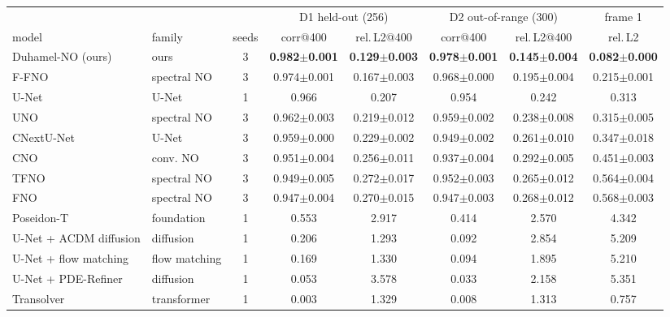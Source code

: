 \begin{tabular}{llcccccc}
\toprule
 & & & \multicolumn{2}{c}{D1 held-out (256)} & \multicolumn{2}{c}{D2 out-of-range (300)} & frame 1 \\
\cmidrule(lr){4-5}\cmidrule(lr){6-7}\cmidrule(lr){8-8}
model & family & seeds & corr@400 & rel.\,L2@400 & corr@400 & rel.\,L2@400 & rel.\,L2 \\
\midrule
Duhamel-NO (ours) & ours & 3 & \textbf{0.982{\scriptsize$\pm$0.001}} & \textbf{0.129{\scriptsize$\pm$0.003}} & \textbf{0.978{\scriptsize$\pm$0.001}} & \textbf{0.145{\scriptsize$\pm$0.004}} & \textbf{0.082{\scriptsize$\pm$0.000}} \\
\midrule
F-FNO & spectral NO & 3 & 0.974{\scriptsize$\pm$0.001} & 0.167{\scriptsize$\pm$0.003} & 0.968{\scriptsize$\pm$0.000} & 0.195{\scriptsize$\pm$0.004} & 0.215{\scriptsize$\pm$0.001} \\
U-Net & U-Net & 1 & 0.966 & 0.207 & 0.954 & 0.242 & 0.313 \\
UNO & spectral NO & 3 & 0.962{\scriptsize$\pm$0.003} & 0.219{\scriptsize$\pm$0.012} & 0.959{\scriptsize$\pm$0.002} & 0.238{\scriptsize$\pm$0.008} & 0.315{\scriptsize$\pm$0.005} \\
CNextU-Net & U-Net & 3 & 0.959{\scriptsize$\pm$0.000} & 0.229{\scriptsize$\pm$0.002} & 0.949{\scriptsize$\pm$0.002} & 0.261{\scriptsize$\pm$0.010} & 0.347{\scriptsize$\pm$0.018} \\
CNO & conv. NO & 3 & 0.951{\scriptsize$\pm$0.004} & 0.256{\scriptsize$\pm$0.011} & 0.937{\scriptsize$\pm$0.004} & 0.292{\scriptsize$\pm$0.005} & 0.451{\scriptsize$\pm$0.003} \\
TFNO & spectral NO & 3 & 0.949{\scriptsize$\pm$0.005} & 0.272{\scriptsize$\pm$0.017} & 0.952{\scriptsize$\pm$0.003} & 0.265{\scriptsize$\pm$0.012} & 0.564{\scriptsize$\pm$0.004} \\
FNO & spectral NO & 3 & 0.947{\scriptsize$\pm$0.004} & 0.270{\scriptsize$\pm$0.015} & 0.947{\scriptsize$\pm$0.003} & 0.268{\scriptsize$\pm$0.012} & 0.568{\scriptsize$\pm$0.003} \\
Poseidon-T & foundation & 1 & 0.553 & 2.917 & 0.414 & 2.570 & 4.342 \\
U-Net + ACDM diffusion & diffusion & 1 & 0.206 & 1.293 & 0.092 & 2.854 & 5.209 \\
U-Net + flow matching & flow matching & 1 & 0.169 & 1.330 & 0.094 & 1.895 & 5.210 \\
U-Net + PDE-Refiner & diffusion & 1 & 0.053 & 3.578 & 0.033 & 2.158 & 5.351 \\
Transolver & transformer & 1 & 0.003 & 1.329 & 0.008 & 1.313 & 0.757 \\
\bottomrule
\end{tabular}